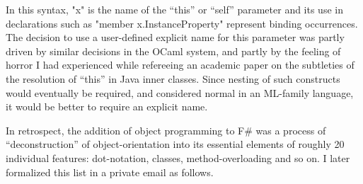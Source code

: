\documentclass[acmsmall,review]{acmart}\settopmatter{printfolios=true,printccs=false,printacmref=false}
\begin{document}
In this syntax, "x" is the name of the “this” or “self” parameter and its use in declarations such as "member x.InstanceProperty" represent binding occurrences.  The decision to use a user-defined explicit name for this parameter was partly driven by similar decisions in the OCaml system, and partly by the feeling of horror I had experienced while refereeing an academic paper on the subtleties of the resolution of “this” in Java inner classes.  Since nesting of such constructs would eventually be required, and considered normal in an ML-family language, it would be better to require an explicit name.

In retrospect, the addition of object programming to F\# was a process of “deconstruction” of object-orientation into its essential elements of roughly 20 individual features: dot-notation, classes, method-overloading and so on.  I later formalized this list in a private email as follows.
\end{document}
